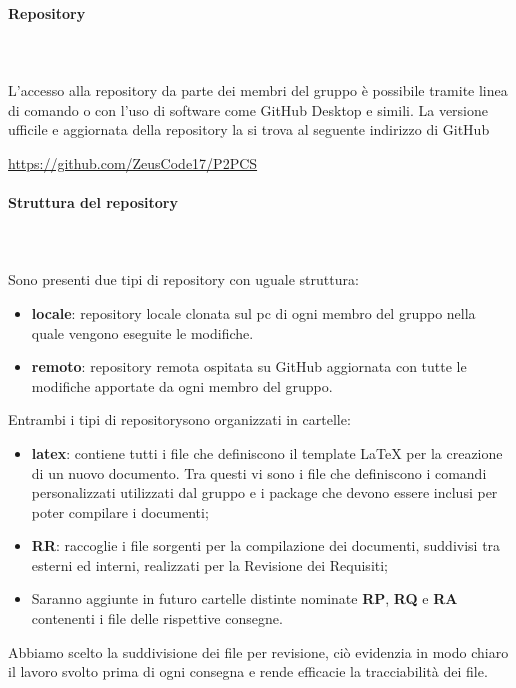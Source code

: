 	\paragraph{Repository} \mbox{}\\ \mbox{}\\
	L'accesso alla repository da parte dei membri del gruppo è possibile tramite linea di comando o con l'uso di software come GitHub Desktop e simili.
	La versione ufficile e aggiornata della repository la si trova al seguente indirizzo di GitHub \newline \newline
	\centerline{\url{https://github.com/ZeusCode17/P2PCS}}
	\paragraph{Struttura del repository} \mbox{}\\ \mbox{}\\
	Sono presenti due tipi di repository con uguale struttura:
	\begin{itemize}
		\item \textbf{locale}: repository locale clonata sul pc di ogni membro del gruppo nella quale vengono eseguite le modifiche.
		\item \textbf{remoto}: repository remota ospitata su GitHub aggiornata con tutte le modifiche apportate da ogni membro del gruppo.
	\end{itemize}		%
	Entrambi i tipi di repository\glosp sono organizzati in cartelle:
	\begin{itemize}
		\item \textbf{latex}: contiene tutti i file che definiscono il template \LaTeX{} per la creazione di un nuovo documento. Tra questi vi sono i file che definiscono i comandi personalizzati utilizzati dal gruppo e i package che devono essere inclusi per poter compilare i documenti;
		\item \textbf{RR}: raccoglie i file sorgenti per la compilazione dei documenti, suddivisi tra esterni ed interni, realizzati per la Revisione dei Requisiti;
		\item Saranno aggiunte in futuro cartelle distinte nominate \textbf{RP}, \textbf{RQ} e \textbf{RA} contenenti i file delle rispettive consegne.
	\end{itemize}
	Abbiamo scelto la suddivisione dei file per revisione, ciò evidenzia in modo chiaro il lavoro svolto prima di ogni consegna e rende efficacie la tracciabilità dei file.
